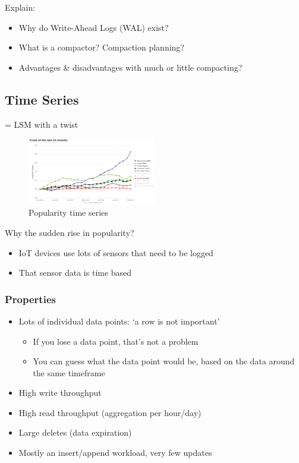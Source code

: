 \documentclass{article}
\begin{document}
Explain:

\begin{itemize}
    \item Why do Write-Ahead Logs (WAL) exist?
    \item What is a compactor? Compaction planning?
    \item Advantages \& disadvantages with much or little compacting?
\end{itemize}

\subsection{Time Series}

= LSM with a twist

\begin{figure}[H]
    \centering
    \includegraphics[width=0.5\textwidth]{time-series-lsm.png}
    \caption{Popularity time series}
\end{figure}

Why the sudden rise in popularity?

\begin{itemize}
    \item IoT devices use lots of sensors that need to be logged
    \item That sensor data is time based
\end{itemize}

\subsubsection{Properties}

\begin{itemize}
    \item Lots of individual data points: `a row is not important'
    \begin{itemize}
        \item If you lose a data point, that's not a problem
        \item You can guess what the data point would be, based on the data around the same timeframe
    \end{itemize}
    \item High write throughput
    \item High read throughput (aggregation per hour/day)
    \item Large deletes (data expiration)
    \item Mostly an insert/append workload, very few updates
\end{itemize}
\end{document}
